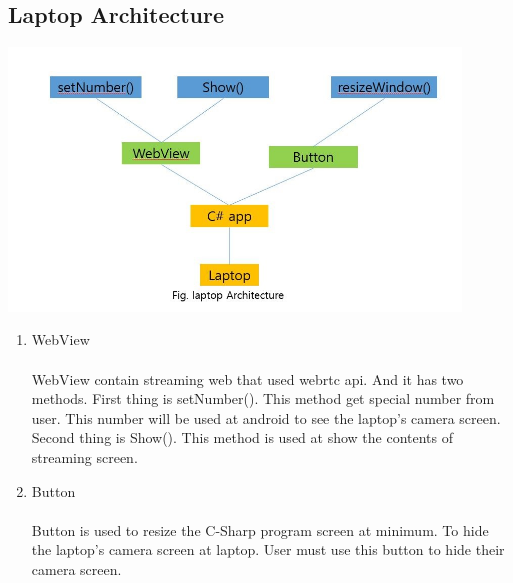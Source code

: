 \documentclass[12pt]{article}
\begin{document}
\subsection*{Laptop Architecture}
\begin{center} 
\includegraphics[width=120mm,scale=1.8]{laptoparchitecture}
\end{center}
\begin{enumerate}
\item WebView\\
\\
 WebView contain streaming web that used webrtc api. And it has two methods. First thing is setNumber(). This method get special number from user. This number will be used at android to see the laptop’s camera screen. Second thing is Show(). This method is used at show the contents of streaming screen.\\

\item Button\\
\\
Button is used to resize the C-Sharp program screen at minimum. To hide the laptop’s camera screen at laptop. User must use this button to hide their camera screen. \\
\end{enumerate}
\end{document}
